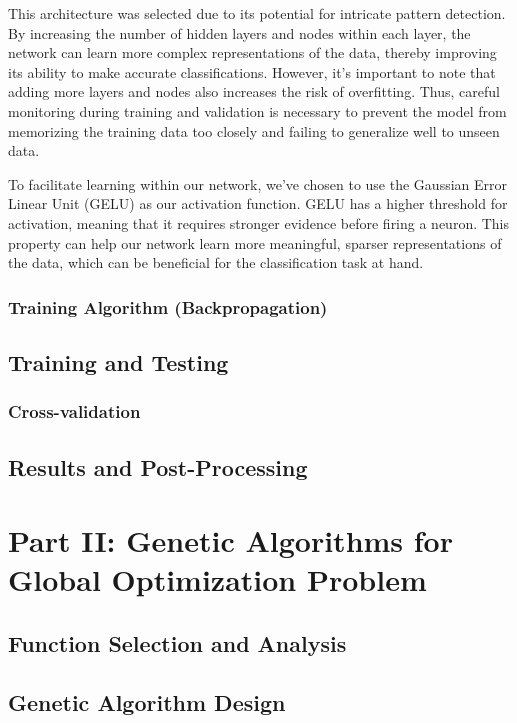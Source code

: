 \documentclass[conference]{inc/IEEEtran}
\begin{document}
This architecture was selected due to its potential for intricate pattern detection. By increasing the number of hidden layers and nodes within each
layer, the network can learn more complex representations of the data, thereby improving its ability to make accurate classifications. However, it's
important to note that adding more layers and nodes also increases the risk of overfitting. Thus, careful monitoring during training and validation
is necessary to prevent the model from memorizing the training data too closely and failing to generalize well to unseen data.

To facilitate learning within our network, we've chosen to use the Gaussian Error Linear Unit (GELU) as our activation function. GELU has a higher
threshold for activation, meaning that it requires stronger evidence before firing a neuron. This property can help our network learn more meaningful,
sparser representations of the data, which can be beneficial for the classification task at hand.

\subsubsection{Training Algorithm (Backpropagation)}

\subsection{Training and Testing}

\subsubsection{Cross-validation}

\subsection{Results and Post-Processing}

\section{Part II: Genetic Algorithms for Global Optimization Problem}

\subsection{Function Selection and Analysis}
\subsection{Genetic Algorithm Design}
\end{document}
